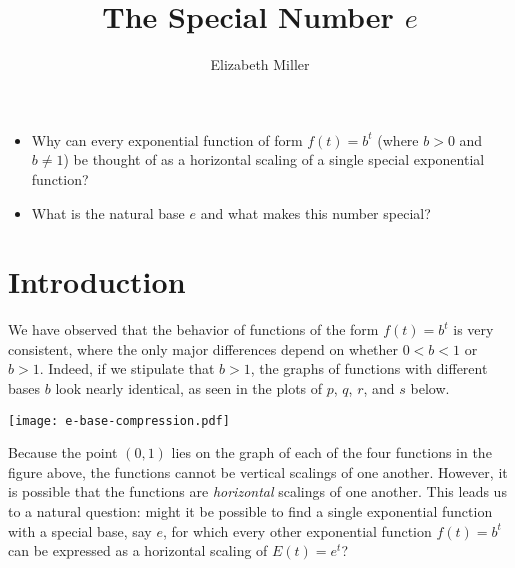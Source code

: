 \documentclass[nooutcomes]{ximera}
\author{Elizabeth Miller}
\title{The Special Number $e$}
\begin{document}
\licenseAPC
\begin{abstract}
  
\end{abstract}
\maketitle



\begin{motivatingQuestions}\begin{itemize}
\item Why can every exponential function of form $f(t) = b^t$ (where $b > 0$ and $b \ne 1$) be thought of as a horizontal scaling of a single special exponential function?
\item What is the natural base $e$ and what makes this number special?
\end{itemize}\end{motivatingQuestions}



\section{Introduction}
We have observed that the behavior of functions of the form $f(t) = b^t$ is very consistent, where the only major differences depend on whether $0< b < 1$ or $b > 1$.  Indeed, if we stipulate that $b > 1$, the graphs of functions with different bases $b$ look nearly identical, as seen in the plots of $p$, $q$, $r$, and $s$ below.

\begin{image}
\texttt{[image: e-base-compression.pdf]}
\end{image}
Because the point $(0,1)$ lies on the graph of each of the four functions in the figure above, the functions cannot be vertical scalings of one another.  However, it is possible that the functions are \emph{horizontal} scalings of one another.  This leads us to a natural question:  might it be possible to find a single exponential function with a special base, say $e$, for which every other exponential function $f(t) = b^t$ can be expressed as a horizontal scaling of $E(t) = e^t$?
\end{document}
